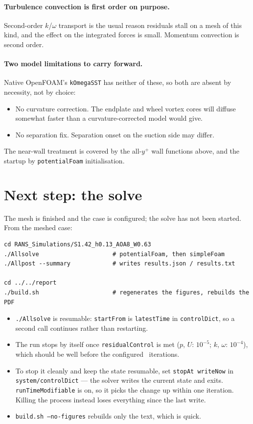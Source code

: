 \documentclass[11pt,a4paper]{article}
\newcommand{\bad}[1]{\textcolor{warn}{#1}}
\begin{document}
\paragraph{Turbulence convection is first order on purpose.} Second-order
$k$/$\omega$ transport is the usual reason residuals stall on a mesh of this
kind, and the effect on the integrated forces is small. Momentum convection
is second order.

\paragraph{Two model limitations to carry forward.} Native OpenFOAM's
\texttt{kOmegaSST} has neither of these, so both are absent by necessity, not
by choice:
\begin{itemize}
\item \bad{No curvature correction.} The endplate and wheel vortex cores will
  diffuse somewhat faster than a curvature-corrected model would give.
\item \bad{No separation fix.} Separation onset on the suction side may
  differ.
\end{itemize}
The near-wall treatment is covered by the all-$y^+$ wall functions above, and
the startup by \texttt{potentialFoam} initialisation.

\section{Next step: the solve}\label{sec:finish}

The mesh is finished and the case is configured; the solve has not been
started. From the meshed case:

\begin{verbatim}
cd RANS_Simulations/S1.42_h0.13_AOA8_W0.63
./Allsolve                     # potentialFoam, then simpleFoam
./Allpost --summary            # writes results.json / results.txt

cd ../../report
./build.sh                     # regenerates the figures, rebuilds the PDF
\end{verbatim}

\begin{itemize}
\item \texttt{./Allsolve} is resumable: \texttt{startFrom} is
  \texttt{latestTime} in \texttt{controlDict}, so a second call continues
  rather than restarting.
\item The run stops by itself once \texttt{residualControl} is met
  ($p$, $U$: $10^{-5}$; $k$, $\omega$: $10^{-4}$), which should be well
  before the configured \nIterations\ iterations.
\item To stop it cleanly and keep the state resumable, set
  \texttt{stopAt writeNow} in \texttt{system/controlDict} --- the solver
  writes the current state and exits. \texttt{runTimeModifiable} is on, so it
  picks the change up within one iteration. Killing the process instead
  loses everything since the last write.
\item \texttt{build.sh --no-figures} rebuilds only the text, which is quick.
\end{itemize}
\end{document}
